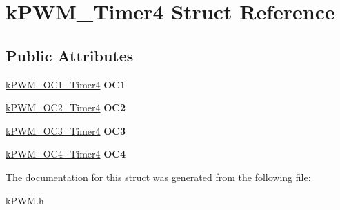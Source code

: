 \hypertarget{structkPWM__Timer4}{}\section{k\+P\+W\+M\+\_\+\+Timer4 Struct Reference}
\label{structkPWM__Timer4}
\subsection*{Public Attributes}
\begin{DoxyCompactItemize}
\item 
\hyperlink{structkPWM__OC1__Timer4}{k\+P\+W\+M\+\_\+\+O\+C1\+\_\+\+Timer4} {\bfseries O\+C1}\hypertarget{structkPWM__Timer4_aa69aa9355e27a7b90a1450e8c7496a35}{}\label{structkPWM__Timer4_aa69aa9355e27a7b90a1450e8c7496a35}

\item 
\hyperlink{structkPWM__OC2__Timer4}{k\+P\+W\+M\+\_\+\+O\+C2\+\_\+\+Timer4} {\bfseries O\+C2}\hypertarget{structkPWM__Timer4_afcbadbab80c51faf963e1180f493d39a}{}\label{structkPWM__Timer4_afcbadbab80c51faf963e1180f493d39a}

\item 
\hyperlink{structkPWM__OC3__Timer4}{k\+P\+W\+M\+\_\+\+O\+C3\+\_\+\+Timer4} {\bfseries O\+C3}\hypertarget{structkPWM__Timer4_aea460129f5323c3989c069eebc673984}{}\label{structkPWM__Timer4_aea460129f5323c3989c069eebc673984}

\item 
\hyperlink{structkPWM__OC4__Timer4}{k\+P\+W\+M\+\_\+\+O\+C4\+\_\+\+Timer4} {\bfseries O\+C4}\hypertarget{structkPWM__Timer4_aa379ee76ef3ab2ace44790b985ee52a5}{}\label{structkPWM__Timer4_aa379ee76ef3ab2ace44790b985ee52a5}

\end{DoxyCompactItemize}


The documentation for this struct was generated from the following file\+:\begin{DoxyCompactItemize}
\item 
k\+P\+W\+M.\+h\end{DoxyCompactItemize}
